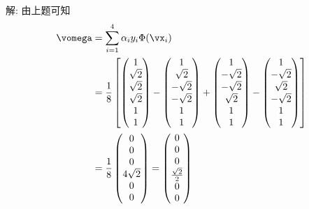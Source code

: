 \documentclass[openany]{ctexbook}
\theoremstyle{kaiti}
\theoremstyle{normal}
\begin{document}
解: 由上题可知
\begin{equation}
  \begin{aligned}
    \vomega
    &=\sum_{i=1}^4\alpha_iy_i\Phi(\vx_i)\\
    &=\frac{1}{8}
    \left[
      \begin{pmatrix}
        1 \\ \sqrt{2} \\ \sqrt{2} \\ \sqrt{2} \\ 1 \\ 1 \\
      \end{pmatrix}
      -\begin{pmatrix}
        1 \\ \sqrt{2} \\ -\sqrt{2} \\ -\sqrt{2} \\ 1 \\ 1 \\
      \end{pmatrix}
      +\begin{pmatrix}
        1 \\ -\sqrt{2} \\ -\sqrt{2} \\ \sqrt{2} \\ 1 \\ 1 \\
      \end{pmatrix}
      -\begin{pmatrix}
        1 \\ -\sqrt{2} \\ \sqrt{2} \\ -\sqrt{2} \\ 1 \\ 1 \\
      \end{pmatrix}
    \right]\\
    &=\frac{1}{8}
      \begin{pmatrix}
        0 \\ 0 \\ 0 \\ 4\sqrt{2} \\ 0 \\ 0 \\
      \end{pmatrix}
    =\begin{pmatrix}
      0 \\ 0 \\ 0 \\ \frac{\sqrt{2}}{2} \\ 0 \\ 0 \\
    \end{pmatrix}
  \end{aligned}
\end{equation}
\end{document}
